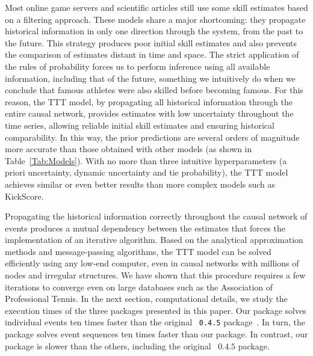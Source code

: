 \documentclass[article]{jss}
\begin{document}
%
%

Most online game servers and scientific articles still use some skill estimates based on a filtering approach.
These models share a major shortcoming: they propagate historical information in only one direction through the system, from the past to the future.
This strategy produces poor initial skill estimates and also prevents the comparison of estimates distant in time and space.
The strict application of the rules of probability forces us to perform inference using all available information, including that of the future, something we intuitively do when we conclude that famous athletes were also skilled before becoming famous.
For this reason, the TTT model, by propagating all historical information through the entire causal network, provides estimates with low uncertainty throughout the time series, allowing reliable initial skill estimates and ensuring historical comparability. 
In this way, the prior predictions are several orders of magnitude more accurate than those obtained with other models (as shown in Table~\ref{Tab:Models}).
With no more than three intuitive hyperparameters (a priori uncertainty, dynamic uncertainty and tie probability), the TTT model achieves similar or even better results than more complex models such as KickScore.

%
%

Propagating the historical information correctly throughout the causal network of events produces a mutual dependency between the estimates that forces the implementation of an iterative algorithm. 
Based on the analytical approximation methods and message-passing algorithms, the TTT model can be solved efficiently using any low-end computer, even in causal networks with millions of nodes and irregular structures. 
We have shown that this procedure requires a few iterations to converge even on large databases such as the Association of Professional Tennis. 
In the next section, computational details, we study the execution times of the three packages presented in this paper. 
Our  package solves individual events ten times faster than the original ~\texttt{0.4.5} package~\citep{Lee2012}. 
In turn, the  package solves event sequences ten times faster than our  package. 
In contrast, our  package is slower than the others, including the original ~$0.4.5$ package. 
\end{document}
